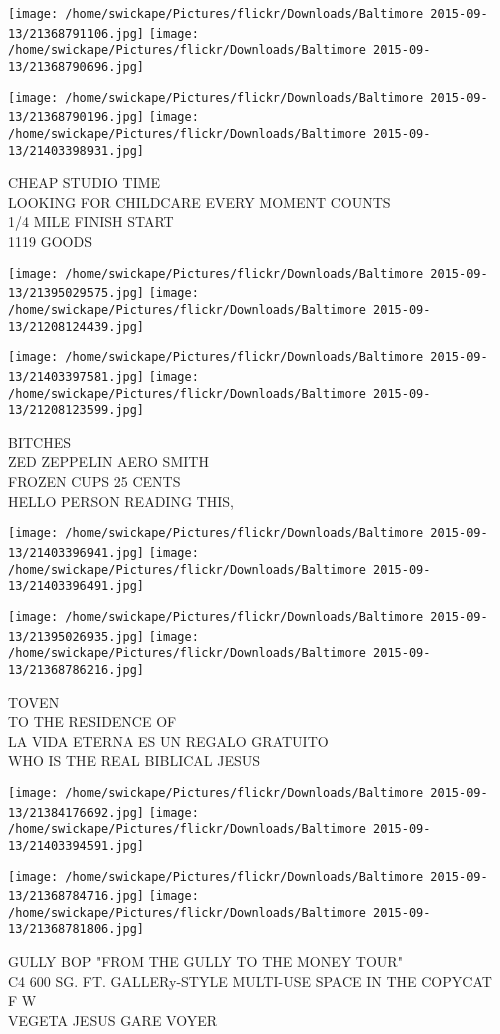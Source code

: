 \documentclass[10pt,letterpaper]{article}
\begin{document}
\texttt{[image: /home/swickape/Pictures/flickr/Downloads/Baltimore 2015-09-13/21368791106.jpg]}
\texttt{[image: /home/swickape/Pictures/flickr/Downloads/Baltimore 2015-09-13/21368790696.jpg]}

\texttt{[image: /home/swickape/Pictures/flickr/Downloads/Baltimore 2015-09-13/21368790196.jpg]}
\texttt{[image: /home/swickape/Pictures/flickr/Downloads/Baltimore 2015-09-13/21403398931.jpg]}

CHEAP STUDIO TIME\\
LOOKING FOR CHILDCARE EVERY MOMENT COUNTS\\
1/4 MILE FINISH START\\
1119 GOODS\\
\pagebreak

\texttt{[image: /home/swickape/Pictures/flickr/Downloads/Baltimore 2015-09-13/21395029575.jpg]}
\texttt{[image: /home/swickape/Pictures/flickr/Downloads/Baltimore 2015-09-13/21208124439.jpg]}

\texttt{[image: /home/swickape/Pictures/flickr/Downloads/Baltimore 2015-09-13/21403397581.jpg]}
\texttt{[image: /home/swickape/Pictures/flickr/Downloads/Baltimore 2015-09-13/21208123599.jpg]}

BITCHES\\
ZED ZEPPELIN AERO SMITH\\
FROZEN CUPS 25 CENTS\\
HELLO PERSON READING THIS,\\
\pagebreak

\texttt{[image: /home/swickape/Pictures/flickr/Downloads/Baltimore 2015-09-13/21403396941.jpg]}
\texttt{[image: /home/swickape/Pictures/flickr/Downloads/Baltimore 2015-09-13/21403396491.jpg]}

\texttt{[image: /home/swickape/Pictures/flickr/Downloads/Baltimore 2015-09-13/21395026935.jpg]}
\texttt{[image: /home/swickape/Pictures/flickr/Downloads/Baltimore 2015-09-13/21368786216.jpg]}

TOVEN\\
TO THE RESIDENCE OF\\
LA VIDA ETERNA ES UN REGALO GRATUITO\\
WHO IS THE REAL BIBLICAL JESUS\\
\pagebreak

\texttt{[image: /home/swickape/Pictures/flickr/Downloads/Baltimore 2015-09-13/21384176692.jpg]}
\texttt{[image: /home/swickape/Pictures/flickr/Downloads/Baltimore 2015-09-13/21403394591.jpg]}

\texttt{[image: /home/swickape/Pictures/flickr/Downloads/Baltimore 2015-09-13/21368784716.jpg]}
\texttt{[image: /home/swickape/Pictures/flickr/Downloads/Baltimore 2015-09-13/21368781806.jpg]}

GULLY BOP "FROM THE GULLY TO THE MONEY TOUR"\\
C4 600 SG. FT. GALLERy{-}STYLE MULTI{-}USE SPACE IN THE COPYCAT\\
F W\\
VEGETA JESUS GARE VOYER\\
\pagebreak
\end{document}
